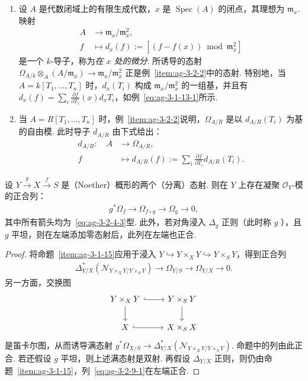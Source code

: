 \begin{example}\label{item:ag-3-2-8}
\begin{enumerate}[label=(\roman*)]
\item 设 $A$ 是代数闭域上的有限生成代数，$x$ 是 $\operatorname{Spec}(A)$ 的闭点，其理想为 $\mathfrak m_x$. 映射
\begin{align*}
A&\longrightarrow\mathfrak m_x/\mathfrak m_x^2,\\
f&\longmapsto d_x(f):=[(f-f(x))\bmod\mathfrak m_x^2]
\end{align*}
是一个 $k$-导子，称为\emph{在 $x$ 处的微分}. 所诱导的态射 $\Omega_{A/k}\otimes_A(A/\mathfrak m_x)\longrightarrow\mathfrak m_x/\mathfrak m_x^2$ 正是例~\ref{item:ag-3-2-2}中的态射. 特别地，当 $A=k[T_1,\ldots,T_n]$ 时，$d_x(T_i)$ 构成 $\mathfrak m_x/\mathfrak m_x^2$ 的一组基，并且有 $d_x(f)=\sum_i\frac{\partial f}{\partial T_i}(x)d_xT_i$，如例~\eqref{eq:ag-3-1-13-1}所示.
\item 当 $A=R[T_1,\ldots,T_n]$ 时，例~\ref{item:ag-3-2-2}说明，$\Omega_{A/R}$ 是以 $d_{A/R}(T_i)$ 为基的自由模. 此时导子 $d_{A/R}$ 由下式给出：
\begin{align*}
d_{A/R}:\quad A&\longrightarrow\Omega_{A/R},\\
f&\longmapsto d_{A/R}(f):=\sum_i\frac{\partial f}{\partial T_i}d_{A/R}(T_i).
\tag*{$\diamond$}
\end{align*}
\end{enumerate}
\renewcommand{\envenddiamond}{}
\end{example}
\begin{proposition}\label{item:ag-3-2-9}
设 $Y\xrightarrow gX\xrightarrow fS$ 是（Noether）概形的两个（分离）态射. 则在 $Y$ 上存在凝聚 $\mathcal O_Y$-模的正合列：
\begin{align*}
g^*\Omega_f\longrightarrow\Omega_{f\circ g}\longrightarrow\Omega_g\longrightarrow0,
\end{align*}
其中所有箭头均为~\eqref{eq:ag-3-2-4-3}型. 此外，若对角浸入 $\Delta_g$ 正则（此时称 $g$ ），且 $g$ 平坦，则在左端添加零态射后，此列在左端也正合.
\end{proposition}
\begin{proof}
将命题~\ref{item:ag-3-1-15}应用于浸入 $Y\hookrightarrow Y\times_XY\hookrightarrow Y\times_SY$，得到正合列
\begin{align}
\Delta_{Y/X}^*(\mathcal N_{Y\times_XY/Y\times_SY})\longrightarrow\Omega_{Y/S}\longrightarrow\Omega_{Y/X}\longrightarrow0.\tag{3.2.9.1}\label{eq:ag-3-2-9-1}
\end{align}
另一方面，交换图
\begin{align*}
\begin{tikzcd}[ampersand replacement=\&]
Y\times_XY\arrow[r,hook]\arrow[d] \& Y\times_SY\arrow[d]\\
X\arrow[r,hook] \& X\times_SX
\end{tikzcd}
\end{align*}
是笛卡尔图，从而诱导满态射 $g^*\Omega_{X/S}\longrightarrow\Delta_{Y/X}^*(\mathcal N_{Y\times_XY/Y\times_SY})$. 命题中的列由此正合. 若还假设 $g$ 平坦，则上述满态射是双射. 再假设 $\Delta_{Y/X}$ 正则，则仍由命题~\ref{item:ag-3-1-15}，列~\eqref{eq:ag-3-2-9-1}在左端正合.
\end{proof}
